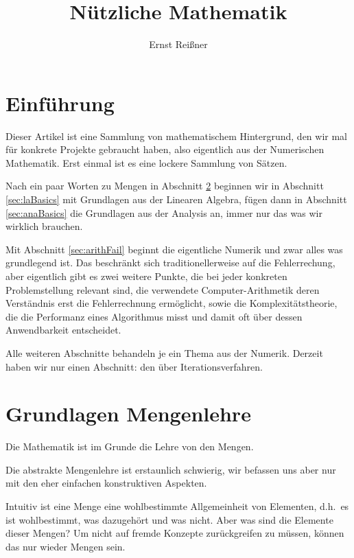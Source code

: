 \documentclass[index=totoc]{scrartcl}%
\title{Nützliche Mathematik}
\author{Ernst Reißner}
\theoremstyle{definition}
\begin{document}
\maketitle
{}

\tableofcontents

\section{Einführung}

Dieser Artikel ist eine Sammlung von mathematischem Hintergrund,
den wir mal für konkrete Projekte gebraucht haben,
also eigentlich aus der Numerischen Mathematik.
Erst einmal ist es eine lockere Sammlung von Sätzen.

Nach ein paar Worten zu Mengen in Abschnitt \ref{sec:setsBasics}
beginnen wir in Abschnitt \ref{sec:laBasics}
mit Grundlagen aus der Linearen Algebra,
fügen dann in Abschnitt \ref{sec:anaBasics} die Grundlagen aus der Analysis an,
immer nur das was wir wirklich brauchen.

Mit Abschnitt \ref{sec:arithFail} beginnt die eigentliche Numerik
und zwar alles was grundlegend ist.
Das beschränkt sich traditionellerweise auf die Fehlerrechung,
aber eigentlich gibt es zwei weitere Punkte,
die bei jeder konkreten Problemstellung relevant sind,
die verwendete Computer-Arithmetik
deren Verständnis erst die Fehlerrechnung ermöglicht,
sowie die Komplexitätstheorie,
die die Performanz eines Algorithmus misst
und damit oft über dessen Anwendbarkeit entscheidet. 

Alle weiteren Abschnitte behandeln je ein Thema aus der Numerik.
Derzeit haben wir nur einen Abschnitt:
den über Iterationsverfahren.

\newpage
\section{Grundlagen Mengenlehre}
\label{sec:setsBasics}

Die Mathematik ist im Grunde die Lehre von den Mengen.

Die abstrakte Mengenlehre ist erstaunlich schwierig,
wir befassen uns aber nur mit den eher einfachen konstruktiven Aspekten.

Intuitiv ist eine Menge eine wohlbestimmte Allgemeinheit von Elementen,
d.h.~es ist wohlbestimmt, was dazugehört und was nicht.
Aber was sind die Elemente dieser Mengen?
Um nicht auf fremde Konzepte zurückgreifen zu müssen,
können das nur wieder Mengen sein.
\end{document}
